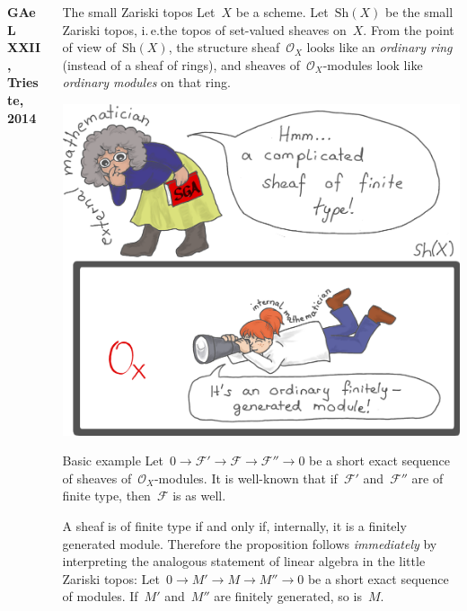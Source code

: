 \documentclass[table]{beamer}
\newcommand{\F}{\mathcal{F}}
\renewcommand{\O}{\mathcal{O}}
\newcommand{\Sh}{\mathrm{Sh}}
\begin{document}
\begin{frame}[t]
\begin{columns}[t]
\begin{column}{0.3\textwidth}
  \vspace{0.7cm}
  \textbf{GAeL XXII, Trieste, 2014}
\end{column}

\begin{column}{0.3\textwidth}
  \begin{block}{The small Zariski topos}
    Let~$X$ be a scheme. Let~$\Sh(X)$ be the small Zariski topos, i.\,e.\@ the
    topos of set-valued sheaves on~$X$. From the point of view of~$\Sh(X)$,
    the structure sheaf~$\O_X$ looks like an \emph{ordinary ring} (instead of a
    sheaf of rings), and sheaves of~$\O_X$-modules look like \emph{ordinary
    modules} on that ring.\bigskip

    \hspace{-0.25cm}%
    \includegraphics[width=\columnwidth]{external-internal}
  \end{block}
  \bigskip

  \begin{block}{Basic example}
    Let~$0 \to \F' \to \F \to \F'' \to 0$ be a short exact sequence of sheaves
    of~$\O_X$-modules. It is well-known that if~$\F'$ and~$\F''$ are of finite type,
    then~$\F$ is as well.\medskip

    A sheaf is of finite type if and only if, internally, it is a
    finitely generated module. Therefore the proposition follows
    \emph{immediately}
    by interpreting the analogous statement of linear algebra
    in the little Zariski topos:
    Let~$0 \to M' \to M \to M'' \to 0$ be a short exact sequence of modules.
    If~$M'$ and~$M''$ are finitely generated, so is~$M$.\medskip


\end{block}
\end{column}
\end{columns}
\end{frame}
\end{document}
